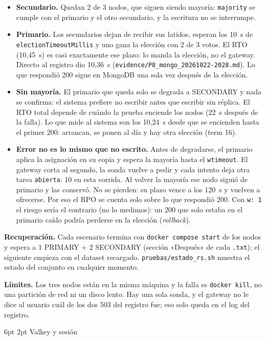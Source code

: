 \documentclass[10pt,letterpaper]{article}
\makeatletter
\newcommand{\ev}[1]{{\footnotesize\texttt{evidence/\allowbreak #1}}}
\renewcommand\subsection{\@startsection{subsection}{2}{\z@}%
  {6pt \@plus 1pt}{2pt}%
  {\normalfont\normalsize\bfseries\color{acc}}}
\makeatother
\begin{document}
\begin{itemize}\setlength{\itemsep}{1pt}
\item \textbf{Secundario.} Quedan 2 de 3 nodos, que siguen siendo mayoría: \texttt{majority} se cumple con el
primario y el otro secundario, y la escritura no se interrumpe.
\item \textbf{Primario.} Los secundarios dejan de recibir sus latidos, esperan los 10~s de
\texttt{electionTimeoutMillis} y uno gana la elección con 2 de 3 votos. El RTO (10,45~s) es casi exactamente
ese plazo: lo manda la elección, no el gateway. Directo al registro dio 10,36~s
(\ev{P8\_mongo\_20261022-2028.md}). Lo que respondió 200 sigue en MongoDB una sola vez después de la
elección.
\item \textbf{Sin mayoría.} El primario que queda solo se degrada a SECONDARY y nada se confirma: el sistema
prefiere no escribir antes que escribir sin réplica. El RTO total depende de cuándo la prueba enciende los
nodos (22~s después de la falla). Lo que mide al sistema son los 10,24~s desde que se encienden hasta el
primer 200: arrancan, se ponen al día y hay otra elección (term 16).
\item \textbf{Error no es lo mismo que no escrito.} Antes de degradarse, el primario aplica la asignación en
su copia y espera la mayoría hasta el \texttt{wtimeout}. El gateway corta al segundo, la sonda vuelve a
pedir y cada intento deja otra tarea \texttt{abierta}: 10 en esta corrida. Al volver la mayoría ese nodo
siguió de primario y las conservó. No se pierden: su plazo vence a los 120~s y vuelven a ofrecerse. Por eso
el RPO se cuenta solo sobre lo que respondió 200. Con \texttt{w: 1} el riesgo sería el contrario (no lo
medimos): un 200 que solo estaba en el primario caído podría perderse en la elección (\emph{rollback}).
\end{itemize}

\textbf{Recuperación.} Cada escenario termina con \texttt{docker compose start} de los nodos y espera a 1
PRIMARY + 2 SECONDARY (sección «Después» de cada \texttt{.txt}); el siguiente empieza con el dataset
recargado. \texttt{pruebas/estado\_rs.sh} muestra el estado del conjunto en cualquier momento.

\textbf{Límites.} Los tres nodos están en la misma máquina y la falla es \texttt{docker kill}, no una
partición de red ni un disco lento. Hay una sola sonda, y el gateway no le dice al usuario cuál de los dos
503 del registro fue; eso solo queda en el log del registro.

\subsection{Valkey y sesión}
\end{document}

